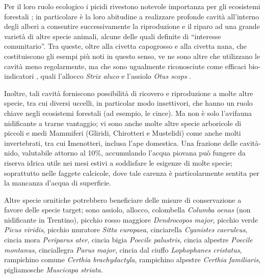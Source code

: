 \documentclass[10pt,twoside,openany,x11names,svgnames,italian,a5paper,dvipsnames,table]{memoir}
\begin{document}
Per il loro ruolo ecologico i picidi rivestono notevole importanza per gli ecosistemi forestali \cite{Mikusinski01} \cite{Gorman04}; in particolare è la loro abitudine a realizzare profonde cavità all’interno degli alberi a consentire successivamente la riproduzione e il riparo ad una grande varietà di altre specie animali, alcune delle quali definite di “interesse comunitario”. Tra queste, oltre alla civetta capogrosso e alla civetta nana, che costituiscono gli esempi più noti in questo senso, ve ne sono altre che utilizzano le cavità meno regolarmente, ma che sono ugualmente riconosciute come efficaci bio-indicatori \cite{Sergio05}, quali l’allocco \emph{Strix aluco}\cite{Marchesi06} e l’assiolo \emph{Otus scops} \cite{Marchesi05}.

Inoltre, tali cavità forniscono possibilità di ricovero e riproduzione a molte altre specie, tra cui diversi uccelli, in particolar modo insettivori, che hanno un ruolo chiave negli ecosistemi forestali (ad esempio, le cince). Ma non è solo l’avifauna nidificante a trarne vantaggio; vi sono anche molte altre specie arboricole di piccoli e medi Mammiferi (Gliridi, Chirotteri e Mustelidi) come anche molti invertebrati, tra cui Imenotteri, inclusa l’ape domestica. Una frazione delle cavità-nido, valutabile attorno al 10\%, accumulando l’acqua piovana può fungere da riserva idrica utile nei mesi estivi a soddisfare le esigenze di molte specie; soprattutto nelle faggete calcicole, dove tale carenza è particolarmente sentita per la mancanza d’acqua di superficie.

Altre specie ornitiche potrebbero beneficiare delle misure di conservazione a favore delle specie target; sono assiolo, allocco, colombella \emph{Columba oenas} (non nidificante in Trentino), picchio rosso maggiore \emph{Dendrocopos major}, picchio verde \emph{Picus viridis}, picchio muratore \emph{Sitta europaea}, cinciarella \emph{Cyanistes caeruleus}, cincia mora \emph{Periparus ater}, cincia bigia \emph{Poecile palustris}, cincia alpestre \emph{Poecile montanus}, cinciallegra \emph{Parus major}, cincia dal ciuffo \emph{Lophophanes cristatus}, rampichino comune \emph{Certhia brachydactyla}, rampichino alpestre \emph{Certhia familiaris}, pigliamosche \emph{Muscicapa striata}.
\end{document}

